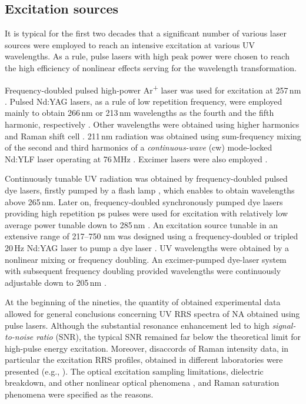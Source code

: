 \subsection{Excitation sources}

It is typical for the first two decades that a significant number of various
laser sources were employed to reach an intensive excitation at various UV
wavelengths.
As a rule, pulse lasers with high peak power were chosen to reach the high
efficiency of nonlinear effects serving for the wavelength transformation.

Frequency-doubled pulsed high-power Ar\textsuperscript{+} laser was used for
excitation at 257\,nm
\parencite{%
	Harada1975,%
	Pezolet1975,%
	Nishimura1977%
}.
Pulsed Nd:YAG lasers, as a rule of low repetition frequency, were employed
mainly to obtain 266\,nm or 213\,nm wavelengths as the fourth and the fifth
harmonic, respectively
\parencite{%
	Ziegler1981,%
	Toyama1993%
}.
Other wavelengths were obtained using higher harmonics
\parencite{Kubasek1985}
and  Raman shift cell
\parencite{%
	Fodor1985,%
	Nishimura1987%
}.
211\,nm radiation was obtained using sum-frequency mixing of the second and
third harmonics of a
\emph{continuous-wave} (cw)
mode-locked Nd:YLF laser operating at 76\,MHz
\parencite{Leonard1994}.
Excimer lasers were also employed
\parencite{Ziegler1983}.

Continuously tunable UV radiation was obtained by frequency-doubled pulsed dye
lasers, firstly pumped by a flash lamp
\parencite{%
	Asher1977,%
	Blazej1977%
},
which enables to obtain wavelengths above 265\,nm.
Later on, frequency-doubled synchronously pumped dye lasers providing high
repetition ps pulses were used for excitation with relatively low average
power tunable down to 285\,nm
\parencite{%
	Bushaw1978,%
	Samanta1982,%
	Benson1992%
}.
An excitation source tunable in an extensive range of 217–750 nm was designed
using a frequency-doubled or tripled 20\,Hz Nd:YAG laser to pump a dye laser
\parencite{Asher1983}.
UV wavelengths were obtained by a nonlinear mixing or frequency doubling.
An excimer-pumped dye-laser system with subsequent frequency doubling provided
wavelengths were continuously adjustable down to 205\,nm
\parencite{Gfrorer1993a}.

At the beginning of the nineties, the quantity of obtained experimental
data allowed for general conclusions concerning UV RRS spectra of NA
obtained using pulse lasers.
Although the substantial resonance enhancement led to high
\emph{signal-to-noise ratio} (SNR), the typical SNR remained far below the
theoretical limit for high-pulse energy excitation.
Moreover, disaccords of Raman intensity data, in particular the excitation RRS
profiles, obtained in different laboratories were presented (e.g.,
\cite{Bushaw1980}).
The optical excitation sampling limitations, dielectric breakdown, and other
nonlinear optical phenomena
\parencite{Teraoka1990},
and Raman saturation phenomena
\parencite{%
	Harmon1990,%
	Johnson1986,%
	Ludwig1988a,%
	Song1991a,%
	Sweeney1990,%
	Teraoka1990%
}
were specified as the reasons.

